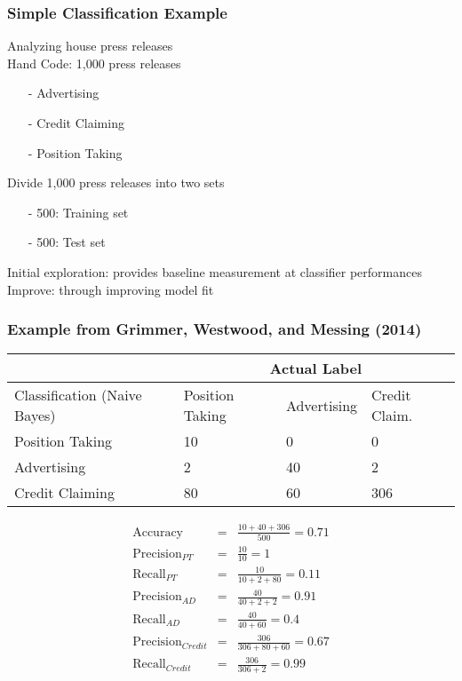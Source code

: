 \documentclass{beamer}
\numberwithin{equation}{section}
\begin{document}
\begin{frame}
\frametitle{Simple Classification Example}

Analyzing house press releases\\
\alert{Hand Code}: 1,000 press releases
\begin{itemize}
\item[-] Advertising
\item[-] Credit Claiming
\item[-] Position Taking
\end{itemize}
Divide 1,000 press releases into two sets
\begin{itemize}
\item[-] 500: Training set
\item[-] 500: Test set
\end{itemize}

\alert{Initial exploration}: provides baseline measurement at classifier performances \\
\alert{Improve}: through improving model fit
\end{frame}





\begin{frame}
\frametitle{Example from Grimmer, Westwood, and Messing (2014)}



\begin{tabular}{l|lll}
 & \multicolumn{3}{c}{Actual Label} \\
 \hline
Classification (Naive Bayes) & Position Taking & Advertising & Credit Claim. \\
Position Taking   &    10  &   0  &   0 \\
Advertising   & 2  & 40  &  2 \\
Credit Claiming   &   80 & 60 & 306\\
\hline\hline
\end{tabular}

\footnotesize
\begin{eqnarray}
\text{Accuracy} & = & \frac{10 + 40 + 306} {500}  = 0.71 \nonumber  \\
\text{Precision}_{PT} & = & \frac{10}{10}  = 1 \nonumber \\
\text{Recall}_{PT} & = & \frac{10}{10 + 2 + 80 }  = 0.11 \nonumber \\
\text{Precision}_{AD} & = & \frac{40}{40 + 2 + 2}  = 0.91 \nonumber \\
\text{Recall}_{AD} & = & \frac{40}{40 + 60 }  = 0.4 \nonumber \\
\text{Precision}_{Credit} & = & \frac{306}{306  + 80 + 60 } = 0.67 \nonumber  \\
\text{Recall}_{Credit} & = & \frac{306}{306 + 2}  = 0.99 \nonumber
\end{eqnarray}

\end{frame}
\end{document}
